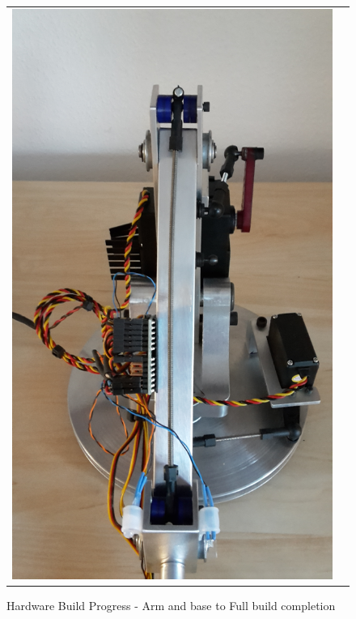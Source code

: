 \documentclass[progress]{cmpreport}
\begin{document}
\begin{figure}[H]
	\centering
	\caption{Hardware Build Progress - Arm and base to Full build completion }
	\begin{tabular}{ll}
		\includegraphics[trim=2cm 2cm 3cm 4cm, clip=true, totalheight=0.15\textheight, angle=-90]{photos/Day 36-pt1.jpg}
		&

\end{tabular}
\end{figure}
\end{document}
